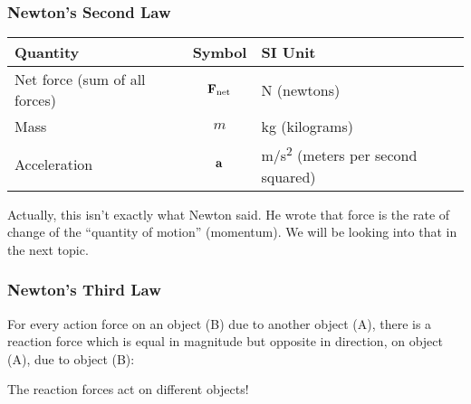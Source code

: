 \documentclass[12pt,compress,aspectratio=169]{beamer}
\newcommand{\mb}[1]{\ensuremath\mathbf{#1}}
\newcommand{\eq}[2]{\vspace{#1}{\Large\begin{displaymath}#2\end{displaymath}}}
\begin{document}
\begin{frame}
  \frametitle{Newton's Second Law}
  \begin{center}
  \end{center}

  \eq{-.2in}{
    \boxed{\mb{F}_{\textrm{net}}=\Sigma\mb{F}=m\mb{a}}
  }
  
  \begin{center}
    \begin{tabular}{l|c|l}
      \rowcolor{pink}
      \textbf{Quantity} & \textbf{Symbol} & \textbf{SI Unit} \\ \hline
      Net force (sum of all forces)  & $\mb{F}_{\textrm{net}}$ &
      \si{N} (newtons)\\
      Mass         & $m$       & \si{kg} (kilograms) \\
      Acceleration & $\mb{a}$  & \si{m/s^2} (meters per second squared) \\
    \end{tabular}
  \end{center}

  Actually, this isn't exactly what Newton said. He wrote that force is the
  rate of change of the ``quantity of motion'' (momentum). We will be looking
  into that in the next topic.
\end{frame}


\begin{frame}
  \frametitle{Newton's Third Law}

  \begin{center}
  \end{center}
 
  For every action force on an object (B) due to another object (A), there is a
  reaction force which is equal in magnitude but opposite in direction, on
  object (A), due to object (B):

  \eq{-.2in}{
    \boxed{\mb{F}_{\textrm{A on B}} = -\mb{F}_{\textrm{B on A}}}
  }
  
  The reaction forces act on different objects!
\end{frame}
\end{document}

